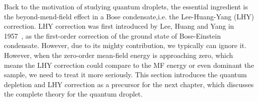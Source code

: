 Back to the motivation of studying quantum droplets, the essential ingredient is the beyond-mend-field effect in a Bose condensate,i.e. the Lee-Huang-Yang (LHY) correction. LHY correction was first introduced by Lee, Huang and Yang in 1957~\cite{lee1957}, as the first-order correction of the ground state of Bose-Einstein condensate. However, due to its mighty contribution, we typically can ignore it. However, when the zero-order mean-field energy is approaching zero, which means the LHY correction could compare to the MF energy or even dominant the sample, we need to treat it more seriously. This section introduces the quantum depletion and LHY correction as a precursor for the next chapter, which discusses the complete theory for the quantum droplet.

